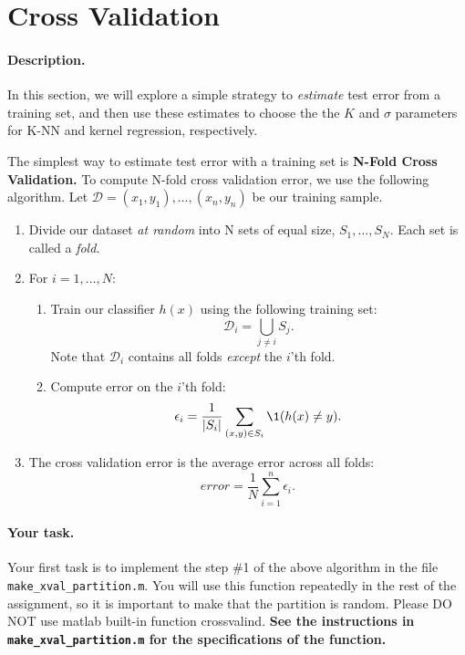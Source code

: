 \section{Cross Validation }

\paragraph{Description.} In this section, we will explore a simple
strategy to {\em estimate} test error from a training set, and then use these estimates to choose the the $K$ and $\sigma$ parameters for
K-NN and kernel regression, respectively.

The simplest way to estimate test error with a training set is {\bf
  N-Fold Cross Validation.} To compute N-fold cross validation error,
we use the following algorithm. Let $\mathcal{D} = (x_1, y_1), \dots,
(x_n, y_n)$ be our training sample.
\begin{enumerate}
\item Divide our dataset {\em at random} into N sets of equal size, $S_1, \dots,
  S_N$. Each set is called a {\em fold.}
\item For $i = 1, \dots, N:$ 
  \begin{enumerate}
  \item Train our classifier $h(x)$ using the following training set:
    $$\mathcal{D}_i = \bigcup_{j\ne i} S_j.$$
    Note that $\mathcal{D}_i$ contains all folds {\em except} the $i$'th fold.
  \item Compute error on the $i$'th fold:
    $$\epsilon_i = \frac{1}{|S_i|}\sum_{(x,y) \in S_i} \1(h(x) \ne y).$$
  \end{enumerate}
\item The cross validation error is the average error across all folds:
  $$error = \frac{1}{N} \sum_{i=1}^n \epsilon_i.$$
\end{enumerate}

\paragraph{Your task.} Your first task is to implement the step \#1 of the above algorithm in the file {\tt make\_xval\_partition.m}. 
You will use this function repeatedly in the rest of the assignment, so it is important to make that the partition is random. 
Please DO NOT use matlab built-in function crossvalind. {\bf See the instructions in {\tt make\_xval\_partition.m} for the specifications of the function.}

